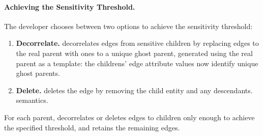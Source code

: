 
\paragraph{Achieving the Sensitivity Threshold.}
The developer chooses between two options to achieve the sensitivity threshold: 
\begin{enumerate}
    \item \textbf{Decorrelate.}
    \proto decorrelates edges from sensitive children by replacing edges to the real parent with
        ones to a unique ghost parent, generated using the real parent as a template:
        the childrens' edge attribute values now identify unique ghost parents. 

\item \textbf{Delete.}
    \proto deletes the edge by removing the child entity and any descendants. 
    semantics.%
\end{enumerate}

For each parent, \proto decorrelates or deletes edges to children only enough to achieve the specified
threshold, and retains the remaining edges. 

\iffalse
